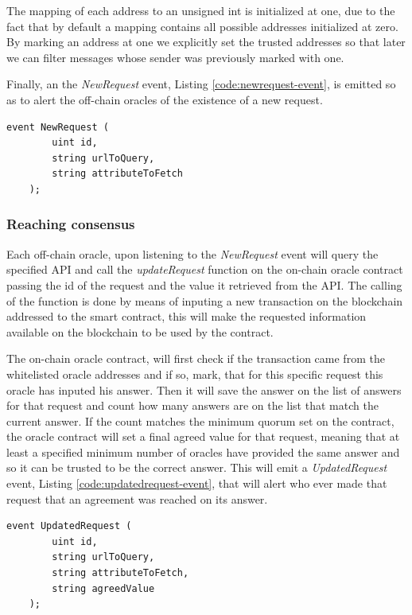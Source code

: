 The mapping of each address to an unsigned int is initialized at one, due to the fact that by default a mapping contains all possible addresses initialized at zero. By marking an address at one we explicitly set the trusted addresses so that later we can filter messages whose sender was previously marked with one.

Finally, an the \textit{NewRequest} event, Listing \ref{code:newrequest-event}, is emitted so as to alert the off-chain oracles of the existence of a new request.

\begin{lstlisting}[language=Solidity, label=code:newrequest-event, caption={Event emmited upon a new request to the on-chain oracle.}]
    event NewRequest (
        uint id,
        string urlToQuery,
        string attributeToFetch
    );
\end{lstlisting}

\subsubsection{Reaching consensus}

Each off-chain oracle, upon listening to the \textit{NewRequest} event will query the specified API and call the \textit{updateRequest} function on the on-chain oracle contract passing the id of the request and the value it retrieved from the API. The calling of the function is done by means of inputing a new transaction on the blockchain addressed to the smart contract, this will make the requested information available on the blockchain to be used by the contract.

The on-chain oracle contract, will first check if the transaction came from the whitelisted oracle addresses and if so, mark, that for this specific request this oracle has inputed his answer. Then it will save the answer on the list of answers for that request and count how many answers are on the list that match the current answer. If the count matches the minimum quorum set on the contract, the oracle contract will set a final agreed value for that request, meaning that at least a specified minimum number of oracles have provided the same answer and so it can be trusted to be the correct answer. This will emit a \textit{UpdatedRequest} event, Listing \ref{code:updatedrequest-event}, that will alert who ever made that request that an agreement was reached on its answer.


\begin{lstlisting}[language=Solidity, label=code:updatedrequest-event, caption={Event emmited by the on-chain oracle upon achieving consensus.}]
    event UpdatedRequest (
        uint id,
        string urlToQuery,
        string attributeToFetch,
        string agreedValue
    );
\end{lstlisting}


